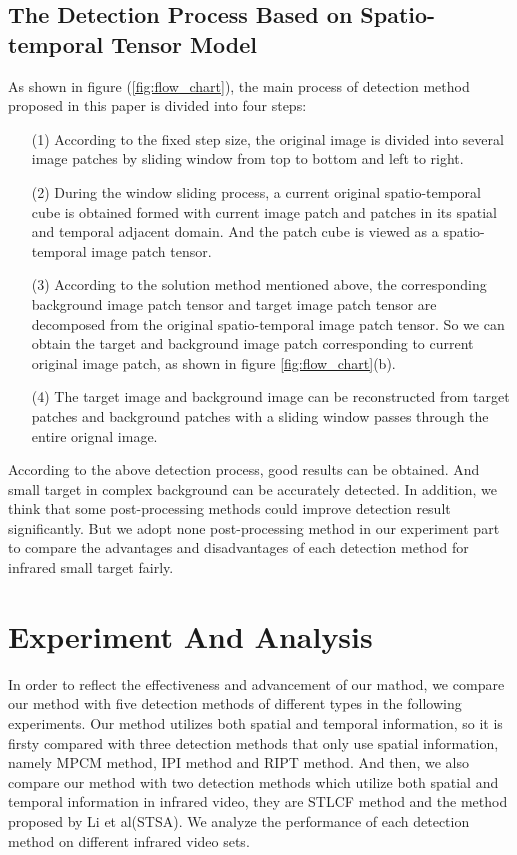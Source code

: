 \documentclass[journal]{IEEEtran}
\begin{document}
\subsection{The Detection Process Based on Spatio-temporal Tensor Model}
As shown in figure (\ref{fig:flow_chart}), the main process of detection method proposed in this paper is divided into four steps:
\begin{itemize}
  \item [(1)]According to the fixed step size, the original image is divided into several image patches by sliding window from top to bottom and left to right.
  \item [(2)]During the window sliding process, a current original spatio-temporal cube is obtained formed with current image patch and patches in its spatial and temporal adjacent domain. And the patch cube is viewed as a spatio-temporal image patch tensor.
  \item [(3)]According to the solution method mentioned above, the corresponding background image patch tensor and target image patch tensor are decomposed from the original spatio-temporal image patch tensor. So we can obtain the target and background image patch corresponding to current original image patch, as shown in figure \ref{fig:flow_chart}(b).
  \item [(4)]The target image and background image can be reconstructed from target patches and background patches with a sliding window passes through the entire orignal image.
\end{itemize}

According to the above detection process, good results can be obtained. And small target in complex background can be accurately detected. In addition, we think that some post-processing methods could improve detection result significantly. But we adopt none post-processing method in our experiment part to compare the advantages and disadvantages of each detection method for infrared small target fairly.


\section{Experiment And Analysis}
In order to reflect the effectiveness and advancement of our mathod, we compare our method with five detection methods of different types in the following experiments. Our method utilizes both spatial and temporal information, so it is firsty compared with three detection methods that only use spatial information, namely MPCM method\cite{wei2016multiscale}, IPI method\cite{gao2013infrared} and RIPT method\cite{dai2017reweighted}. And then, we also compare our method with two detection methods which utilize both spatial and temporal information in infrared video, they are STLCF method\cite{deng2016infrared} and the method proposed by Li et al\cite{li2016novel}(STSA). We analyze the performance of each detection method on different infrared video sets.
\end{document}
